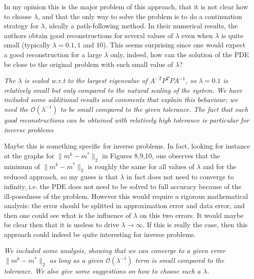 \documentclass[12pt]{article}
\begin{document}
\vspace{5mm}

In my opinion this is the major problem of this approach, that it is not clear how to choose $\lambda$, and that the only way to solve the problem is to do a continuation strategy for $\lambda$, ideally a path-following method. In their numerical results, the authors obtain good reconstructions for several values of $\lambda$ even when $\lambda$ is quite small (typically $\lambda=0.1,1$ and $10$). This seems surprising since one would expect a good reconstruction for a large $\lambda$ only, indeed, how can the solution of the PDE be close to the original problem with such small value of $\lambda$? 

\vspace{5mm}

\emph{The $\lambda$ is scaled w.r.t to the largest eigenvalue of $A^{-T}P^TPA^{-1}$, so $\lambda=0.1$ is relatively small but only compared to the natural scaling of the system. We have included some additional results and comments that explain this behaviour; we need the $\mathcal{O}(\lambda^{-1})$ to be small compared to the given tolerance. The fact that such good reconstructions can be obtained with relatively high tolerance is particular for inverse problems}

\vspace{5mm}

Maybe this is something specific for inverse problems. In fact, looking for instance at the graphs for $\|m^k - m^*\|_2$ in Figures 8,9,10, one observes that the minimum of $\|m^k - m^*\|_2$ is roughly the same for all values of $\lambda$ and for the reduced approach, so my guess is that $\lambda$ in fact does not need to converge to infinity, i.e. the PDE does not need to be solved to full accuracy because of the ill-posedness of the problem. However this would require a rigorous mathematical analysis: the error should be splitted in approximation error and data error, and then one could see what is the influence of $\lambda$ on this two errors. It would maybe be clear then that it is useless to drive $\lambda\to\infty$. If this is really the case, then this approach could indeed be quite interesting for inverse problems. 

\vspace{5mm}

\emph{We included some analysis, showing that we can converge to a given error $\|m^k - m^*\|_2$ as long as a given $\mathcal{O}(\lambda^{-1})$ term is small compared to the tolerance. We also give some suggestions on how to choose such a $\lambda$.}
\end{document}
